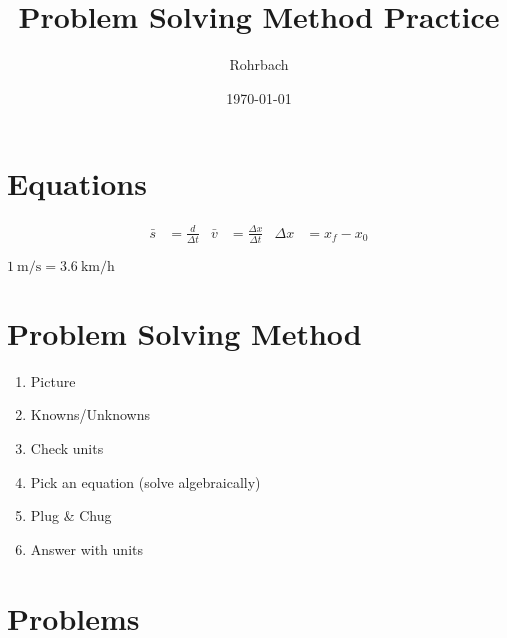 \documentclass[10pt]{exam}
\title{Problem Solving Method Practice}
\author{Rohrbach}
\date{\today}
\begin{document}
\maketitle

\section*{Equations}

\begin{center}
  \begin{align*}
    \bar{s} &= \frac{d}{\Delta t} &
    \bar{v} &= \frac{\Delta x}{\Delta t} &
    \Delta x &= x_f - x_0
  \end{align*}

  \vspace{1em}

  $\SI{1}{\meter\per\second}=\SI{3.6}{\kilo\meter\per\hour}$
\end{center}

\section*{Problem Solving Method}

\begin{enumerate}
  \item Picture
  \item Knowns/Unknowns
  \item Check units
  \item Pick an equation (solve algebraically)
  \item Plug \& Chug
  \item Answer with units
\end{enumerate}

\section*{Problems}
\end{document}
